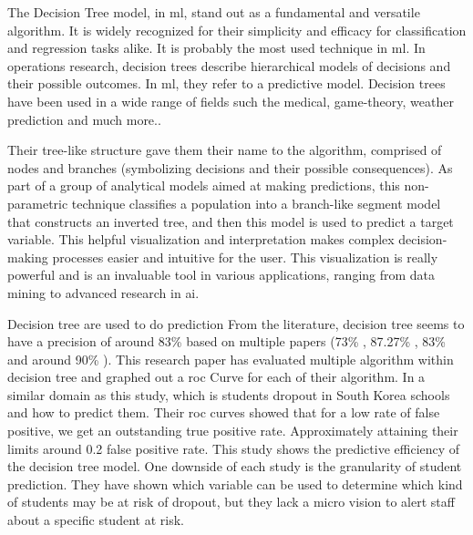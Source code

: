 \documentclass[../../../main.tex]{subfiles}
\begin{document}
The Decision Tree model, in \acrshort{ml}, stand out as a fundamental and versatile algorithm. It is widely recognized for their simplicity and efficacy for classification and regression tasks alike. It is probably the most used technique in \acrshort{ml}. \cite{hofmann_rapidminer_2016}
In operations research, decision trees describe hierarchical models of decisions and their possible outcomes. In \acrshort{ml}, they refer to a predictive model.\cite{rokach_data_2015}
Decision trees have been used in a wide range of fields such the medical, game-theory, weather prediction and much more.\cite{quinlan_induction_1986}.

Their tree-like structure gave them their name to the algorithm, comprised of nodes and branches (symbolizing decisions and their possible consequences). As part of a group of analytical models aimed at making predictions, this non-parametric technique classifies a population into a branch-like segment model that constructs an inverted tree, and then this model is used to predict a target variable.\cite{song_decision_2015} This helpful visualization and interpretation makes complex decision-making processes easier and intuitive for the user. This visualization is really powerful and is an invaluable tool in various applications, ranging from data mining to advanced research in \acrfull{ai}.

Decision tree are used to do prediction
From the literature, decision tree seems to have a precision of around 83\% based on multiple papers (73\% \cite{viloria_integration_2019}, 87.27\% \cite{ramirez_prediction_2018},  83\%\cite{kemper_predicting_2020} and around 90\% \cite{tenpipat_student_2020}). 
This research paper has evaluated multiple algorithm within decision tree and graphed out a \acrshort{roc} Curve for each of their algorithm. In a similar domain as this study, which is students dropout in South Korea schools and how to predict them. Their \acrshort{roc} curves showed that for a low rate of false positive, we get an outstanding true positive rate. Approximately attaining their limits around 0.2 false positive rate\cite{lee_machine_2019}. This study shows the predictive efficiency of the decision tree model. 
One downside of each study is the granularity of student prediction. They have shown which variable can be used to determine which kind of students may be at risk of dropout, but they lack a micro vision to alert staff about a specific student at risk.
\end{document}
